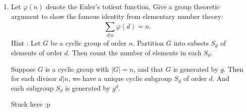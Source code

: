 \documentclass{article}
\begin{document}
\begin{enumerate}
\item Let $\varphi(n)$ denote the Euler’s totient function.
Give a group theoretic argument to show the famous
identity from elementary number theory:
\[
\sum_{d|n}^{} \varphi(d)=n
.\] 
Hint : Let $G$ be a cyclic group of order $n$. Partition $G$ into subsets $S_d$ of elements of order 
$d$.
Then count the number of elements in each $S_d$.

Suppose $G$ is a cyclic group with $|G|=n$, and that $G$ is generated by $g$. Then for each divisor $d|n$, we have a unique cyclic
subgroup $S_d$ of order $d$. And each subgroup $S_d$ is generated by $g^{d}$. 

Stuck here :p
\end{enumerate}
\end{document}
